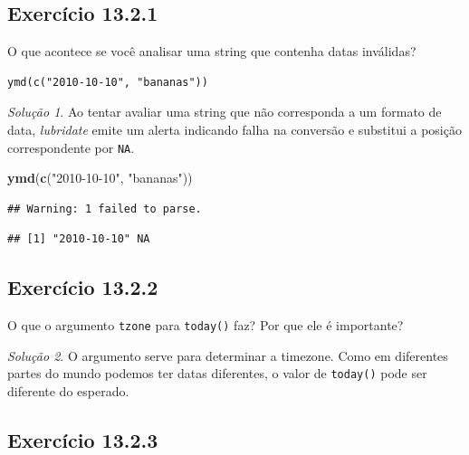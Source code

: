 \documentclass[
]{latex/krantz}
\newenvironment{Shaded}{\begin{snugshade}}{\end{snugshade}}
\newcommand{\FunctionTok}[1]{\textcolor[rgb]{0.13,0.29,0.53}{\textbf{#1}}}
\newcommand{\NormalTok}[1]{#1}
\newcommand{\StringTok}[1]{\textcolor[rgb]{0.31,0.60,0.02}{#1}}
\theoremstyle{definition}
\theoremstyle{definition}
\theoremstyle{definition}
\theoremstyle{definition}
\theoremstyle{remark}
\newtheorem*{solution}{Solução}
\begin{document}
\hypertarget{exr13-2-1}{%
\subsection*{Exercício 13.2.1}\label{exr13-2-1}}

O que acontece se você analisar uma string que contenha datas inválidas?

\begin{verbatim}
ymd(c("2010-10-10", "bananas"))
\end{verbatim}

\begin{solution}

Ao tentar avaliar uma string que não corresponda a um formato de data, \emph{lubridate} emite um alerta indicando falha na conversão e substitui a posição correspondente por \texttt{NA}.

\begin{Shaded}
\begin{Highlighting}[]
\FunctionTok{ymd}\NormalTok{(}\FunctionTok{c}\NormalTok{(}\StringTok{"2010{-}10{-}10"}\NormalTok{, }\StringTok{"bananas"}\NormalTok{))}
\end{Highlighting}
\end{Shaded}

\begin{verbatim}
## Warning: 1 failed to parse.
\end{verbatim}

\begin{verbatim}
## [1] "2010-10-10" NA
\end{verbatim}

\end{solution}

\hypertarget{exr13-2-2}{%
\subsection*{Exercício 13.2.2}\label{exr13-2-2}}

O que o argumento \texttt{tzone} para \texttt{today()} faz? Por que ele é importante?

\begin{solution}
O argumento serve para determinar a timezone. Como em diferentes partes do mundo podemos ter datas diferentes, o valor de \texttt{today()} pode ser diferente do esperado.
\end{solution}

\hypertarget{exr13-2-3}{%
\subsection*{Exercício 13.2.3}\label{exr13-2-3}}
\end{document}
